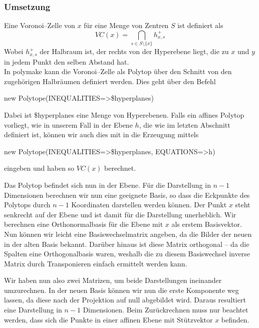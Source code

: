         \subsubsection*{Umsetzung}
         Eine Voronoi--Zelle von $x$ für eine Menge von Zentren $S$ ist definiert als 
         $$ VC(x) = \bigcap_{s \in S \setminus \{ x \}} h^+_{x,s}$$
         Wobei $h^+_{x,s}$ der Halbraum ist, der rechts von der Hyperebene liegt, die zu $x$ und $y$ in jedem Punkt den selben Abstand hat.\\
         
         \noindent In polymake kann die Voronoi--Zelle als Polytop über den Schnitt von den zugehörigen Halbräumen definiert werden. Dies geht über den Befehl

         \begin{code}
            new Polytope(INEQUALITIES=>\$hyperplanes)
         \end{code}

         Dabei ist \$hyperplanes eine Menge von Hyperebenen. Falls ein affines Polytop vorliegt, wie in unserem Fall in der Ebene $h$, die wie im letzten Abschnitt
         definiert ist, können wir auch dies mit in die Erzeugung mittels

         \begin{code}
            new Polytope(INEQUALITIES=>\$hyperplanes, EQUATIONS=>{h})
         \end{code}

         eingeben und haben so $VC(x)$ berechnet. 
         
         \noindent Das Polytop befindet sich nun in der Ebene. Für die Darstellung in $n-1$ Dimensionen berechnen wir nun eine geeignete Basis, so dass die Eckpunkte des Polytops durch $n-1$ Koordinaten darstellen werden können. 
         Der Punkt $x$ steht senkrecht auf der Ebene und ist damit für die Darstellung 
         unerheblich. Wir berechnen eine Orthonormalbasis für die Ebene mit $x$ als erstem Basisvektor. Nun können wir leicht eine Basiswechselmatrix angeben,
         da die Bilder der neuen in der alten Basis bekannt. Darüber hinaus ist diese Matrix orthogonal -- da die Spalten eine Orthogonalbasis waren, weshalb die zu diesem Basiswechsel inverse Matrix durch Transponieren einfach ermittelt werden kann.

         Wir haben nun also zwei Matrizen, um beide Darstellungen ineinander umzurechnen. In der neuen Basis können wir nun die erste Komponente weg lassen, da diese nach der Projektion auf null abgebildet wird. Daraus resultiert eine Darstellung in $n-1$ Dimensionen.
         Beim Zurückrechnen muss nur beachtet werden, dass sich die Punkte in einer affinen Ebene mit Stützvektor $x$ befinden.

